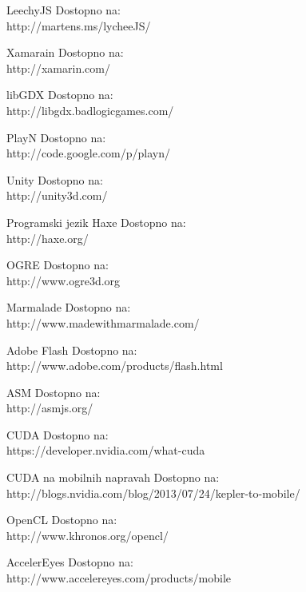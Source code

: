 \begin{thebibliography}{1}
 LeechyJS 
Dostopno na:\\ http://martens.ms/lycheeJS/

 Xamarain
Dostopno na:\\ http://xamarin.com/

 libGDX 
Dostopno na:\\ http://libgdx.badlogicgames.com/

 PlayN 
Dostopno na:\\ http://code.google.com/p/playn/

 Unity 
Dostopno na:\\ http://unity3d.com/

 Programski jezik Haxe
Dostopno na:\\ http://haxe.org/

 OGRE
Dostopno na:\\ http://www.ogre3d.org

 Marmalade
Dostopno na:\\ http://www.madewithmarmalade.com/

 Adobe Flash
Dostopno na:\\ http://www.adobe.com/products/flash.html

 ASM
Dostopno na:\\ http://asmjs.org/

 CUDA
Dostopno na:\\ https://developer.nvidia.com/what-cuda

 CUDA na mobilnih napravah
Dostopno na:\\ http://blogs.nvidia.com/blog/2013/07/24/kepler-to-mobile/

 OpenCL
Dostopno na:\\ http://www.khronos.org/opencl/

 AccelerEyes
Dostopno na:\\ http://www.accelereyes.com/products/mobile

\end{thebibliography}


